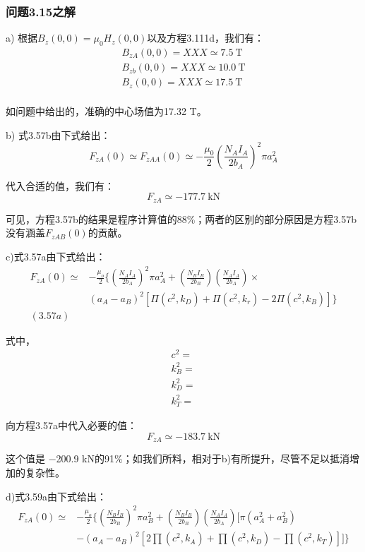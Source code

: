 \subsubsection{问题3.15之解}
a) 根据$B_z(0,0)=\mu_0H_z(0, 0)$以及方程3.111d，我们有：
\begin{eqnarray}
B_{zA}(0,0)=XXX\simeq 7.5\ \mathrm{T}\\
B_{zb}(0,0)=XXX\simeq 10.0\ \mathrm{T}\\
B_{z}(0,0)=XXX\simeq 17.5\ \mathrm{T}\\
\end{eqnarray}

如问题中给出的，准确的中心场值为17.32 T。

b) 式3.57b由下式给出：
\begin{equation}
F_{zA}(0)\simeq F_{zAA}(0)\simeq-\frac{\mu_{0}}{2}(\frac{N_{A}I_{A}}{2b_{A}})^{2}\pi a_{A}^{2}%
\end{equation}

代入合适的值，我们有：
\begin{equation}
F_{zA}\simeq -177.7\ \mathrm{kN}
\end{equation}

可见，方程3.57b的结果是程序计算值的88\%；两者的区别的部分原因是方程3.57b没有涵盖$F_{zAB}(0)$的贡献。 

c)式3.57a由下式给出：
\begin{equation}
\begin{split}
F_{zA}(0)\simeq&-\frac{\mu_{o}}{2}\{(\frac{N_{A}I_{A}}{2b_{A}})^{2}\pi a_{A}^{2}+(\frac{N_{B}I_{B}}{2b_{B}})(\frac{N_{A}I_{A}}{2b_{A}})\times\\
&(a_{A}-a_{B})^{2}[\Pi(c^{2},k_{D})+\Pi(c^{2},k_{r})-2\Pi(c^{2},k_{B})]\}\\(3.57a)
\end{split}
\end{equation}

式中，
\begin{eqnarray}
c^2= \\
k_B^2=\\
k_D^2=\\
k_T^2=
\end{eqnarray}

向方程3.57a中代入必要的值：
\begin{equation}
F_{zA}\simeq -183.7\ \mathrm{kN}
\end{equation}

这个值是 −200.9 kN的91\%；如我们所料，相对于b)有所提升，尽管不足以抵消增加的复杂性。 

d)式3.59a由下式给出：
\begin{equation}
\begin{split}
F_{zA}(0)\simeq&-\frac{\mu_{o}}{2}\{(\frac{N_{B}I_{B}}{2b_{B}})^{2}\pi a_{B}^{2}+(\frac{N_{B}I_{B}}{2b_{B}})(\frac{N_{A}I_{A}}{2b_{A}})[\pi(a_{A}^{2}+a_{B}^{2})\\
&-(a_{A}-a_{B})^{2}[2\prod(c^{2},k_{A})+\prod(c^{2},k_{D})-\prod(c^{2},k_{T})]]\}\\%
\end{split}
\end{equation}

